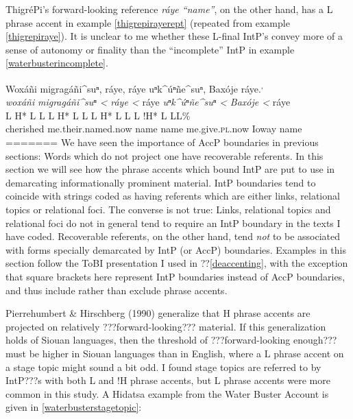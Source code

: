 \documentclass[output=paper]{LSP/langsci}
\begin{document}
ThigréPi’s forward-looking reference \emph{ráye “name”}, on the other hand, has a L phrase accent in example \ref{thigrepirayerept} (repeated from example \ref{thigrepiraye}). It is unclear to me whether these L-final IntP’s convey more of a sense of autonomy or finality than the “incomplete” IntP in example \ref{waterbusterincomplete}.

\ea\label{thigrepirayerept}
Woxáñi migragáñi\^{}suⁿ, ráye, ráye uⁿk\^{}úⁿñe\^{}suⁿ, Baxóje ráye.\footnotemark\textsuperscript{,} \footnotemark\\
\glll	\emph{woxáñi} 	\emph{migragáñi\^{}suⁿ <}		\emph{ráye <}	ráye		\emph{uⁿk\^{}úⁿñe\^{}suⁿ <}	\emph{Baxóje <}		ráye\\
	{\ob L H* L}		{L\cb}	{\ob L H* L L\cb}	{\ob L H* L}	{L\cb}	{\ob L !H* L} 		{L\cb{}L\%}\\
	cherished		me.their.named.now			name			name		me.give.\textsc{pl}.now		Ioway				name\\
=======
	We have seen the importance of AccP boundaries in previous sections: Words which do not project one have recoverable referents. In this section we will see how the phrase accents which bound IntP are put to use in demarcating informationally prominent material. IntP boundaries tend to coincide with strings coded as having referents which are either links, relational topics or relational foci. The converse is not true: Links, relational topics and relational foci do not in general tend to require an IntP boundary in the texts I have coded. Recoverable referents, on the other hand, tend \emph{not} to be associated with forms specially demarcated by IntP (or AccP) boundaries. Examples in this section follow the ToBI presentation I used in ??\ref{deaccenting}, with the exception that square brackets here represent IntP boundaries instead of AccP boundaries, and thus include rather than exclude phrase accents.
	
	Pierrehumbert \& Hirschberg (1990) generalize that H phrase accents are projected on relatively ???forward-looking??? material. If this generalization holds of Siouan languages, then the threshold of ???forward-looking enough??? must be higher in Siouan languages than in English, where a L phrase accent on a stage topic might sound a bit odd. I found stage topics are referred to by IntP???s with both L and !H phrase accents, but L phrase accents were more common in this study. A Hidatsa example from the Water Buster Account is given in \ref{waterbusterstagetopic}:
	
\end{document}
